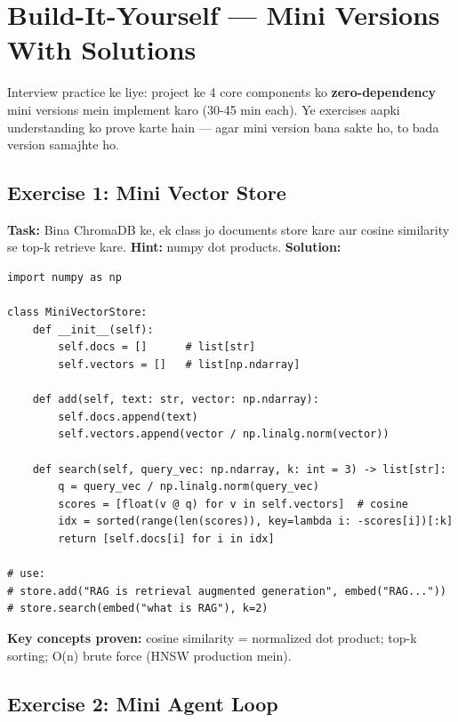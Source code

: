 \section{Build-It-Yourself --- Mini Versions With Solutions}

\begin{storybox}
Interview practice ke liye: project ke 4 core components ko \textbf{zero-dependency} mini versions mein implement karo (30-45 min each). Ye exercises aapki understanding ko prove karte hain --- agar mini version bana sakte ho, to bada version samajhte ho.
\end{storybox}

\subsection{Exercise 1: Mini Vector Store}

\begin{codestorybox}
\textbf{Task:} Bina ChromaDB ke, ek class jo documents store kare aur cosine similarity se top-k retrieve kare. \textbf{Hint:} numpy dot products. \textbf{Solution:}

\begin{lstlisting}[style=pythonstyle, caption={mini vector store}]
import numpy as np

class MiniVectorStore:
    def __init__(self):
        self.docs = []      # list[str]
        self.vectors = []   # list[np.ndarray]

    def add(self, text: str, vector: np.ndarray):
        self.docs.append(text)
        self.vectors.append(vector / np.linalg.norm(vector))

    def search(self, query_vec: np.ndarray, k: int = 3) -> list[str]:
        q = query_vec / np.linalg.norm(query_vec)
        scores = [float(v @ q) for v in self.vectors]  # cosine
        idx = sorted(range(len(scores)), key=lambda i: -scores[i])[:k]
        return [self.docs[i] for i in idx]

# use:
# store.add("RAG is retrieval augmented generation", embed("RAG..."))
# store.search(embed("what is RAG"), k=2)
\end{lstlisting}

\textbf{Key concepts proven:} cosine similarity = normalized dot product; top-k sorting; O(n) brute force (HNSW production mein).
\end{codestorybox}

\subsection{Exercise 2: Mini Agent Loop}

